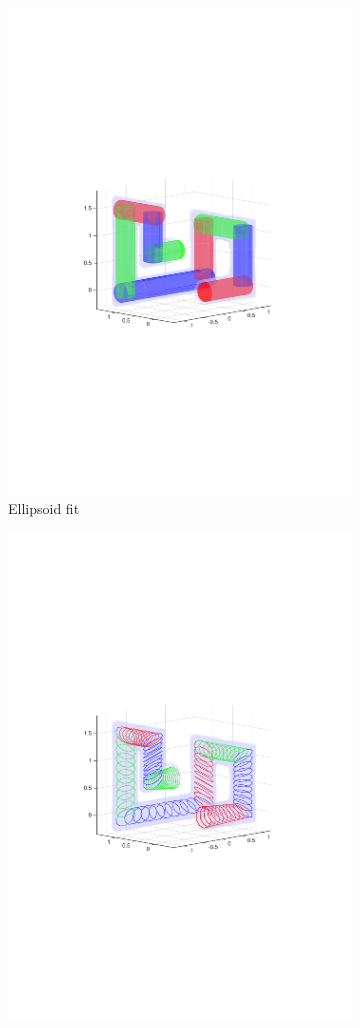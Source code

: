 \documentclass[12pt,a4]{article}
\begin{document}
\begin{figure}[ht!]
    \centering
    \begin{subfigure}{0.325\textwidth}
        \centering
        \includegraphics[width=0.75\linewidth]{figures/pipefitell.pdf}
        \caption{Ellipsoid fit \label{fig:pipefitell}}
    \end{subfigure}%
    \begin{subfigure}{0.325\textwidth}
        \centering
        \includegraphics[width=0.75\linewidth]{figures/pipefitcyl.pdf}

\end{subfigure}
\end{figure}
\end{document}
